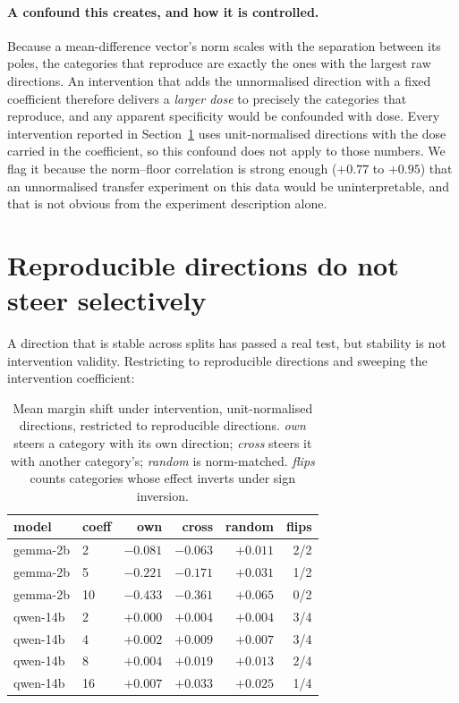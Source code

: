 \documentclass{article}
\begin{document}
\paragraph{A confound this creates, and how it is controlled.} Because a
mean-difference vector's norm scales with the separation between its poles, the
categories that reproduce are exactly the ones with the largest raw directions.
An intervention that adds the unnormalised direction with a fixed coefficient
therefore delivers a \emph{larger dose} to precisely the categories that
reproduce, and any apparent specificity would be confounded with dose. Every
intervention reported in Section~\ref{sec:transfer} uses unit-normalised
directions with the dose carried in the coefficient, so this confound does not
apply to those numbers. We flag it because the norm--floor correlation is strong
enough ($+0.77$ to $+0.95$) that an unnormalised transfer experiment on this data
would be uninterpretable, and that is not obvious from the experiment
description alone.

\section{Reproducible directions do not steer selectively}
\label{sec:transfer}

A direction that is stable across splits has passed a real test, but stability
is not intervention validity. Restricting to reproducible directions and
sweeping the intervention coefficient:

\begin{table}[h]
\centering
\caption{Mean margin shift under intervention, unit-normalised directions,
restricted to reproducible directions. \emph{own} steers a category with its own
direction; \emph{cross} steers it with another category's; \emph{random} is
norm-matched. \emph{flips} counts categories whose effect inverts under sign
inversion.}
\label{tab:transfer}
\begin{tabular}{llrrrr}
\toprule
model & coeff & own & cross & random & flips \\
\midrule
gemma-2b & 2  & $-0.081$ & $-0.063$ & $+0.011$ & 2/2 \\
gemma-2b & 5  & $-0.221$ & $-0.171$ & $+0.031$ & 1/2 \\
gemma-2b & 10 & $-0.433$ & $-0.361$ & $+0.065$ & 0/2 \\
\midrule
qwen-14b & 2  & $+0.000$ & $+0.004$ & $+0.004$ & 3/4 \\
qwen-14b & 4  & $+0.002$ & $+0.009$ & $+0.007$ & 3/4 \\
qwen-14b & 8  & $+0.004$ & $+0.019$ & $+0.013$ & 2/4 \\
qwen-14b & 16 & $+0.007$ & $+0.033$ & $+0.025$ & 1/4 \\
\bottomrule
\end{tabular}
\end{table}
\end{document}
